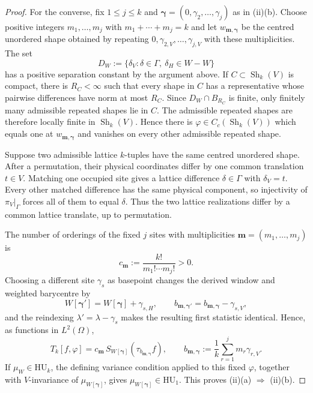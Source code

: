\documentclass[11pt,reqno,a4paper]{amsart}
\numberwithin{equation}{section}
\theoremstyle{compact}
\theoremstyle{definition}
\theoremstyle{definition}
\newcommand{\HU}{\mathrm{HU}}
\newcommand{\Sh}{\operatorname{Sh}}
\begin{document}
\begin{proof}
For the converse, fix $1\leq j\leq k$ and
$\boldsymbol\gamma=(0,\gamma_2,\ldots,\gamma_j)$ as in
\textup{(ii)(b)}.  Choose positive integers $m_1,\ldots,m_j$ with
$m_1+\cdots+m_j=k$ and let $w_{\mathbf m,\boldsymbol\gamma}$ be the centred
unordered shape obtained by repeating
$0,\gamma_{2,V},\ldots,\gamma_{j,V}$ with these multiplicities.  The set
\begin{equation}\label{eq:cap-admissible-differences-uniform-discrete}
  D_W:=\{\delta_V:\delta\in\Gamma,\ \delta_H\in W-W\}
\end{equation}
has a positive separation constant by the argument above.  If $C\subset
\Sh_k(V)$ is compact, there is $R_C<\infty$ such that every shape in $C$ has a
representative whose pairwise differences have norm at most $R_C$.  Since
$D_W\cap B_{R_C}$ is finite, only finitely many admissible repeated shapes lie
in $C$.  The admissible repeated shapes are therefore locally finite in
$\Sh_k(V)$.  Hence there is $\varphi\in C_c(\Sh_k(V))$ which equals one at
$w_{\mathbf m,\boldsymbol\gamma}$ and vanishes on every other admissible
repeated shape.

Suppose two admissible lattice $k$-tuples have the same centred unordered
shape.  After a permutation, their physical coordinates differ by one common
translation $t\in V$.  Matching one occupied site gives a lattice difference
$\delta\in\Gamma$ with $\delta_V=t$.  Every other matched difference has the
same physical component, so injectivity of $\pi_V|_\Gamma$ forces all of them
to equal $\delta$.  Thus the two lattice realizations differ by a common
lattice translate, up to permutation.

The number of orderings of the fixed $j$ sites with multiplicities
$\mathbf m=(m_1,\ldots,m_j)$ is
\begin{equation}\label{eq:cap-multinomial-constant}
  c_{\mathbf m}:=\frac{k!}{m_1!\cdots m_j!}>0.
\end{equation}
Choosing a different site $\gamma_s$ as basepoint changes the derived window
and weighted barycentre by
\[
  W[\boldsymbol\gamma']
    =W[\boldsymbol\gamma]+\gamma_{s,H},
  \qquad
  b_{\mathbf m,\boldsymbol\gamma'}
    =b_{\mathbf m,\boldsymbol\gamma}-\gamma_{s,V},
\]
and the reindexing $\lambda'=\lambda-\gamma_s$ makes the resulting first
statistic identical.  Hence, as functions in $L^2(\Omega)$,
\begin{equation}\label{eq:cap-isolated-derived-window-statistic}
  T_k[f,\varphi]
  =c_{\mathbf m}\,
    S_{W[\boldsymbol\gamma]}
      (\tau_{b_{\mathbf m,\boldsymbol\gamma}}f),
  \qquad
  b_{\mathbf m,\boldsymbol\gamma}
  :=\frac1k\sum_{r=1}^j m_r\gamma_{r,V}.
\end{equation}
If $\mu_W\in\HU_k$, the defining variance condition applied to this fixed
$\varphi$, together with $V$-invariance of
$\mu_{W[\boldsymbol\gamma]}$, gives
$\mu_{W[\boldsymbol\gamma]}\in\HU_1$.  This proves
\textup{(ii)(a)} $\Rightarrow$ \textup{(ii)(b)}.
\end{proof}
\end{document}
